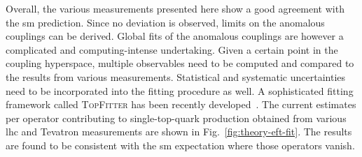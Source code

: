 
Overall, the various measurements presented here show a good agreement with the \gls{sm} prediction. Since no deviation is observed, limits on the anomalous couplings can be derived. Global fits of the anomalous couplings are however a complicated and computing-intense undertaking. Given a certain point in the coupling hyperspace, multiple observables need to be computed and compared to the results from various measurements. Statistical and systematic uncertainties need to be incorporated into the fitting procedure as well. A sophisticated fitting framework called \textsc{TopFitter} has been recently developed~\cite{Buckley:2015lku}. The current estimates per operator contributing to single-top-quark production obtained from various \gls{lhc} and Tevatron measurements are shown in Fig.~\ref{fig:theory-eft-fit}. The results are found to be consistent with the \gls{sm} expectation where those operators vanish.


